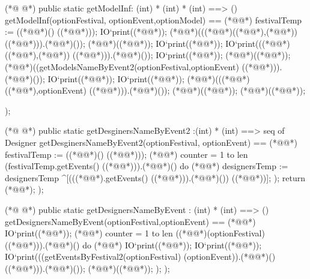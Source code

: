 \begin{vdmpp}[breaklines=true]
  
(*@
\label{getModelInf:146}
@*)
  public static getModelInf: (int) * (int) * (int) ==> ()
  getModelInf(optionFestival, optionEvent,optionModel) ==
  (*@\vdmnotcovered{(}@*) 
  festivalTemp := ((*@@*)() ((*@@*)));
  IO`print((*@@*));
   (*@@*)(((*@@*)((*@@*),(*@@*)) ((*@@*))).(*@@*)());
   (*@@*)((*@@*));
   IO`print((*@@*));
   IO`print(((*@@*)((*@@*),(*@@*)) ((*@@*))).(*@@*)());
   IO`print((*@@*));
   (*@@*)((*@@*));
   (*@@*)((getModelsNameByEvent2(optionFestival,optionEvent) ((*@@*))).(*@@*)());
   IO`print((*@@*));
   IO`print((*@@*));
   (*@@*)(((*@@*)((*@@*),optionEvent) ((*@@*))).(*@@*)());
   (*@@*)((*@@*));
   (*@@*)((*@@*));
    
  );
 
(*@
\label{getDesginersNameByEvent2:166}
@*)
 public static getDesginersNameByEvent2 :(int) * (int) ==> seq of Designer
  getDesginersNameByEvent2(optionFestival, optionEvent) == (*@\vdmnotcovered{(}@*)
  festivalTemp := ((*@@*)() ((*@@*)));
    (*@@*) counter = 1 to len (festivalTemp.getEvents() ((*@@*))).(*@@*)() do (*@\vdmnotcovered{(}@*)
    designersTemp := designersTemp ^[(((*@@*).getEvents() ((*@@*))).(*@@*)()) ((*@@*))];
   );
   return (*@@*);
  );
 
(*@
\label{getDesignersNameByEvent:175}
@*)
 public static getDesignersNameByEvent : (int) * (int) ==> ()
  getDesignersNameByEvent(optionFestival,optionEvent) == (*@\vdmnotcovered{(}@*)
      IO`print((*@@*));
    (*@@*) counter = 1 to len ((*@@*)(optionFestival) ((*@@*))).(*@@*)() do (*@\vdmnotcovered{(}@*)
    IO`print((*@@*));
    IO`print((*@@*));
    IO`print(((getEventsByFestival2(optionFestival) (optionEvent)).(*@@*)() ((*@@*))).(*@@*)());
    (*@@*)((*@@*));
  );
  );
  

\end{vdmpp}
